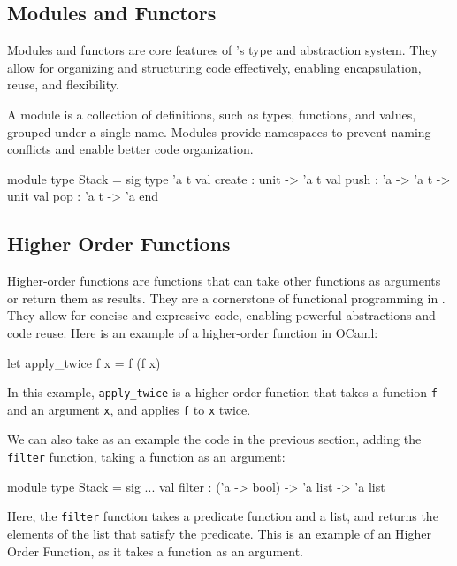 \subsection{Modules and Functors} %
\label{sub:modules_and_functors}

Modules and functors are core features of \ocaml’s type and abstraction system. 
They allow for organizing and structuring code effectively, enabling encapsulation, 
reuse, and flexibility.

A module is a collection of definitions, such as types, functions, and values, 
grouped under a single name. Modules provide namespaces to prevent naming conflicts 
and enable better code organization.

\begin{ocamlenv}
    module type Stack = sig
        type 'a t
        val create : unit -> 'a t
        val push : 'a -> 'a t -> unit
        val pop : 'a t -> 'a
    end
\end{ocamlenv}

\subsection{Higher Order Functions}
\label{sub:higher_order_functions}

Higher-order functions are functions that can take other functions as arguments 
or return them as results. They are a cornerstone of functional programming in \ocaml.
They allow 
for concise and expressive code, enabling powerful abstractions and code reuse. 
Here is an example of a higher-order function in OCaml:

\begin{ocamlenv}
    let apply_twice f x = f (f x)
\end{ocamlenv}

In this example, \texttt{apply\_twice} is a higher-order function that takes a function 
\texttt{f} and an argument \texttt{x}, and applies \texttt{f} to \texttt{x} twice.

We can also take as an example the code in the previous section, adding the \texttt{filter} 
function, taking a function as an argument:

\begin{ocamlenv}
    module type Stack = sig
        ...
        val filter : ('a -> bool) -> 'a list -> 'a list
\end{ocamlenv}

Here, the \texttt{filter} function takes a predicate function and a list, and returns 
the elements of the list that satisfy the predicate. This is an example of an Higher Order 
Function, as it takes a function as an argument.

